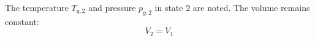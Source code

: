 The temperature \( T_{g,2} \) and pressure \( p_{g,2} \) in state 2 are noted. The volume remains constant:  
\[
V_2 = V_1
\]